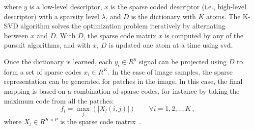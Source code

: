 \begin{description}
\noindent where $y$ is a low-level descriptor, $x$ is the sparse coded descriptor (i.e., high-level descriptor) with a sparsity level $\lambda$, and $D$ is the dictionary with $K$ atoms.
The K-SVD algorithm solves the optimization problem iteratively by alternating between $x$ and $D$. 
With $D$, the sparse code matrix $x$ is computed by any of the pursuit algorithms, and with $x$, $D$ is updated one atom at a time using \ac{svd}. 

Once the dictionary is learned, each $y_{i} \in R^{n}$ signal can be projected using $D$ to form a set of sparse codes $x_{i} \in R^{K}$. 
In the case of image samples, the sparse representation can be generated for patches in the image.
In this case, the final mapping is based on a combination of sparse codes, for instance by taking the maximum code from all the patches: 
\begin{equation}
f_{i} = \max_{j}(\vert X_{l}(i,j)\vert) \qquad  \forall  i = 1, 2, .., K \,,
\end{equation} 
\noindent where $X_{l} \in R^{K \times P}$ is the sparse code matrix~\cite{sidibe2015discrimination}. 
\end{description}






